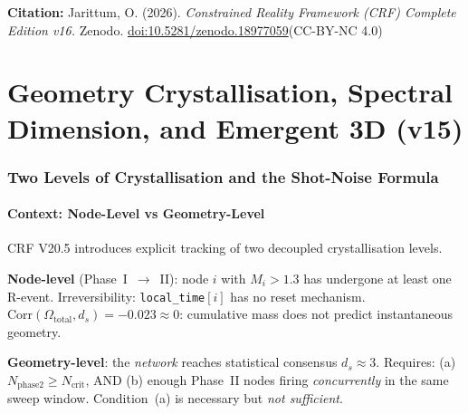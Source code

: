 \documentclass[12pt, a4paper]{article}
\begin{document}
\medskip
\begin{center}
\textbf{Citation:} Jarittum, O. (2026). \textit{Constrained Reality Framework (CRF) Complete Edition v16.}
Zenodo. \href{https://doi.org/10.5281/zenodo.18977059}{doi:10.5281/zenodo.18977059}\quad (CC-BY-NC 4.0)
\end{center}

\part{Geometry Crystallisation, Spectral Dimension, and Emergent 3D (v15)}

\section{Two Levels of Crystallisation and the Shot-Noise Formula}

\subsection{Context: Node-Level vs Geometry-Level}

CRF V20.5 introduces explicit tracking of two decoupled crystallisation levels.

\begin{formalbox}[title={Two Crystallisation Levels (Confirmed, CRF\_GeomLock)}]
\textbf{Node-level} (Phase~I~$\to$~II): node $i$ with $M_i > 1.3$ has undergone at least one R-event.
Irreversibility: \texttt{local\_time}$[i]$ has no reset mechanism.
$\mathrm{Corr}(\Omega_{\mathrm{total}}, d_s) = -0.023 \approx 0$: cumulative mass does not predict instantaneous geometry.

\textbf{Geometry-level}: the \emph{network} reaches statistical consensus $d_s\approx 3$.
Requires: (a) $N_{\mathrm{phase2}}\geq N_{\mathrm{crit}}$, AND
(b) enough Phase~II nodes firing \emph{concurrently} in the same sweep window.
Condition~(a) is necessary but \emph{not sufficient}.
\end{formalbox}
\end{document}
